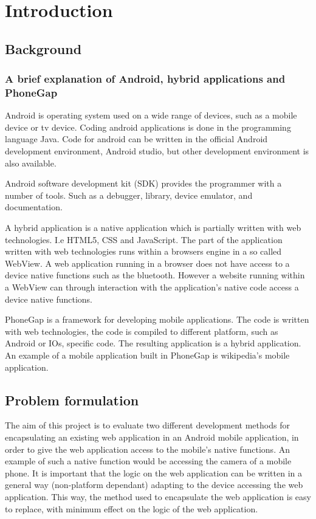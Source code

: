 \chapter{Introduction}
\section{Background}
\subsection{A brief explanation of Android, hybrid applications and PhoneGap}

Android is operating system used on a wide range of devices, such as a mobile device or tv device. Coding android applications is done in the programming language Java. Code for android can be written in the official Android development environment, Android studio, but other development environment is also available. 

Android software development kit (SDK) provides the programmer with a number of tools. Such as a debugger, library, device emulator, and documentation.  

A hybrid application is a native application which is partially written with web technologies. I.e HTML5, CSS and JavaScript. The part of the application written with web technologies runs within a browsers engine in a so called WebView. A web application running in a browser does not have access to a device native functions such as the bluetooth. However a website running within a WebView can through interaction with the application's native code access a device native functions.

PhoneGap is a framework for developing mobile applications. The code is written with web technologies, the code is compiled to different platform, such as Android or IOs, specific code. The resulting application is a hybrid application. An example of a mobile application built in PhoneGap is wikipedia's mobile application.  

\section{Problem formulation}

The aim of this project is to evaluate two different development methods for encapsulating an existing web application in an Android mobile application, in order to give the web application access to the mobile's native functions. An example of such a native function would be accessing the camera of a mobile phone. It is important that the logic on the web application can be written in a general way (non-platform dependant) adapting to the device accessing the web application. This way, the method used to encapsulate the web application is easy to replace, with minimum effect on the logic of the web application. 

